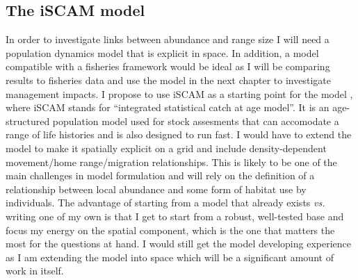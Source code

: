 \documentclass{article}
\begin{document}


\subsection{The iSCAM model}
In order to investigate links between abundance and range size I will
need a population dynamics model that is explicit in space. In
addition, a model compatible with a fisheries framework would be ideal as I
will be comparing results to fisheries data and use the model in the
next chapter to investigate management impacts. I propose to use iSCAM
as a starting point for the model \citep{Martell2012_a}, where iSCAM
stands for ``integrated statistical
catch at age model''. It is an age-structured population model used
for stock assesments that can accomodate a range of life histories and
is also designed to run fast. I would have to extend the model to make
it spatially explicit on a grid and include density-dependent
movement/home range/migration relationships. This is likely to be one
of the main challenges in model formulation and will rely on the
definition of a relationship between local abundance and some form of
habitat use by individuals. The advantage of starting from a model
that already exists \emph{vs.} writing one of my own is that I get to start
from a robust, well-tested base and focus my energy on the spatial
component, which is the one that matters the most for the questions at
hand. I would still get the model developing experience as I am
extending the model into space which will be a significant amount of
work in itself.
\end{document}

